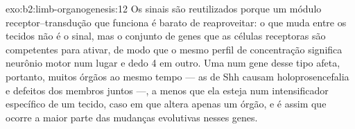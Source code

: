 \begin{solution}{exo:b2:limb-organogenesis:12}
Os sinais são reutilizados porque um módulo receptor--transdução que
funciona é barato de reaproveitar: o que muda entre os tecidos não é o
sinal, mas o conjunto de genes que as células receptoras são
competentes para ativar, de modo que o mesmo perfil de concentração
significa neurônio motor num lugar e dedo 4 em outro. Uma  num
gene desse tipo afeta, portanto, muitos órgãos ao mesmo tempo --- as
 de Shh causam holoprosencefalia e defeitos dos membros juntos
---, a menos que ela esteja num intensificador específico de um tecido,
caso em que altera apenas um órgão, e é assim que ocorre a maior parte
das mudanças evolutivas nesses genes.
\end{solution}

